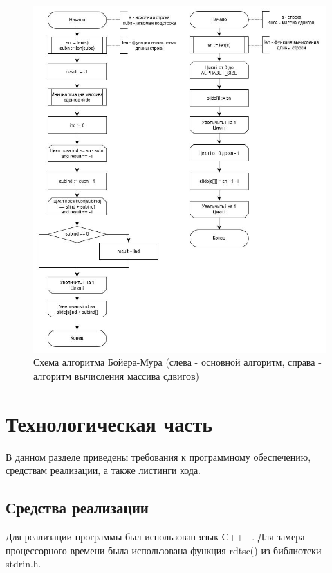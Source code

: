 \documentclass[12pt, a4paper]{report}
\begin{document}
	\begin{figure}[ht!]
		\centering
		\includegraphics[scale=0.55]{img/bm_ext.jpg}
		\caption{Схема алгоритма Бойера-Мура (слева - основной алгоритм, справа - алгоритм вычисления массива сдвигов)}
		\label{ris:bm}
	\end{figure}\newpage

	\newpage
	
	\chapter{Технологическая часть}
	В данном разделе приведены требования к программному обеспечению, средствам реализации, а также листинги кода.
	\section{Средства реализации}
	Для реализации программы был использован язык C++ ~\cite{CPP}. Для замера процессорного времени была использована функция rdtsc() из библиотеки stdrin.h.
	
\end{document}
